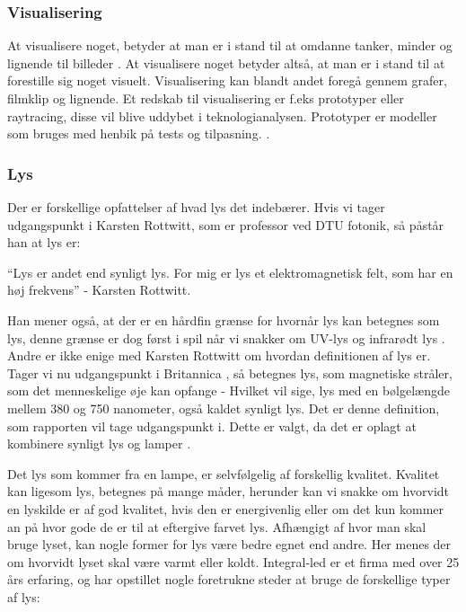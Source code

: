 \subsubsection{Visualisering}
At visualisere noget, betyder at man er i stand til at omdanne tanker, minder og lignende til billeder \cite{ddo_visualisering}. At visualisere noget betyder altså, at man er i stand til at forestille sig noget visuelt. Visualisering kan blandt andet foregå gennem grafer, filmklip og lignende.  
\newline Et redskab til visualisering er f.eks prototyper eller raytracing, disse vil blive uddybet i teknologianalysen. Prototyper er modeller som bruges med henbik på tests og tilpasning. \cite{prototyper_pdf}.

\subsubsection{Lys}
Der er forskellige opfattelser af hvad lys det indebærer. Hvis vi tager udgangspunkt i Karsten Rottwitt, som er professor ved DTU fotonik, så påstår han at lys er:

“Lys er andet end synligt lys. For mig er lys et elektromagnetisk felt, som har en høj frekvens”
- Karsten Rottwitt\cite{def_lys}.

Han mener også, at der er en hårdfin grænse for hvornår lys kan betegnes som lys, denne grænse er dog først i spil når vi snakker om UV-lys og infrarødt lys \cite{def_lys}. 
Andre er ikke enige med Karsten Rottwitt om hvordan definitionen af lys er. Tager vi nu udgangspunkt i Britannica \cite{britannica_lys}, så betegnes lys, som magnetiske stråler, som det menneskelige øje kan opfange - Hvilket vil sige, lys med en bølgelængde mellem 380 og 750 nanometer, også kaldet synligt lys. 
\newline Det er denne definition, som rapporten vil tage udgangspunkt i. Dette er valgt, da det er oplagt at kombinere synligt lys og lamper \cite{def_lys}.

Det lys som kommer fra en lampe, er selvfølgelig af forskellig kvalitet. Kvalitet kan ligesom lys, betegnes på mange måder, herunder kan vi snakke om hvorvidt en lyskilde er af god kvalitet, hvis den er energivenlig eller om det kun kommer an på hvor gode de er til at eftergive farvet lys. 
Afhængigt af hvor man skal bruge lyset, kan nogle former for lys være bedre egnet end andre. Her menes der om hvorvidt lyset skal være varmt eller koldt. Integral-led er et firma med over 25 års erfaring\cite{integral_led}, og har opstillet nogle foretrukne steder at bruge de forskellige typer af lys:


